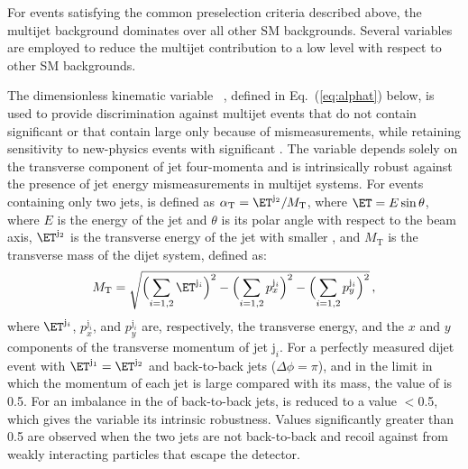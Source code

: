 For events satisfying the common preselection criteria described
above, the multijet background dominates over all other SM
backgrounds. Several variables are employed to reduce the multijet
contribution to a low level with respect to other SM backgrounds.

The dimensionless kinematic variable \alphat~\cite{Randall:2008rw,
  RA1Paper}, defined in Eq.~(\ref{eq:alphat}) below, is used to
provide discrimination against multijet events that do not contain
significant \ptvecmiss or that contain large \ptvecmiss only because
of \pt mismeasurements, while retaining sensitivity to new-physics
events with significant \ptvecmiss. The \alphat variable depends
solely on the transverse component of jet four-momenta
and is intrinsically robust against the presence of jet energy
mismeasurements in multijet systems. For events containing only two
jets, \alphat is defined as $\alphat = \ET^{\mathrm{j}_2}/M_\mathrm{T}$,
where $\ET= E\sin\theta$,
where $E$ is the energy of the jet and $\theta$ is its polar angle
with respect to the beam axis, $\ET^{\mathrm{j}_2}$ is the transverse
energy of the jet with smaller \ET, and $M_\mathrm{T}$ is the transverse
mass of the dijet system, defined as:
\begin{equation}
  \label{eq:mt}
  M_\mathrm{T} = \sqrt{ \Bigl( \sum_{i=1,2} \ET^{\mathrm{j}_i}
    \Bigr)^2 - \Bigl( \sum_{i=1,2} p_x^{\mathrm{j}_i} \Bigr)^2 - \Bigl(
      \sum_{i=1,2} p_y^{\mathrm{j}_i} \Bigr)^2}\, ,
\end{equation}
where $\ET^{\mathrm{j}_i}$, $p_x^{\mathrm{j}_i}$, and
$p_y^{\mathrm{j}_i}$ are, respectively, the transverse energy, and the
$x$ and $y$ components of the transverse momentum of jet
$\mathrm{j}_i$.
For a perfectly measured dijet event with $\ET^{\mathrm{j_1}} =
\ET^{\mathrm{j_2}}$ and back-to-back jets ($\Delta\phi = \pi$), and in
the limit in which the momentum of each jet is large compared with its
mass, the value of \alphat is 0.5. For an imbalance in the \ET of
back-to-back jets, \alphat is reduced to a value $<$0.5, which gives
the variable its intrinsic robustness. Values significantly greater
than 0.5 are observed when the two jets are not back-to-back and
recoil against \ptvecmiss from weakly interacting particles that
escape the detector.

